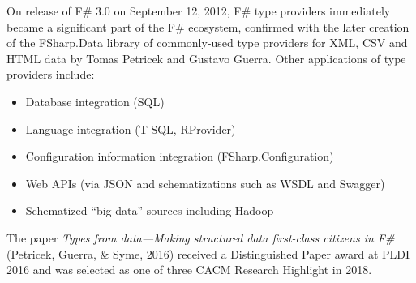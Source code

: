 \documentclass[acmsmall]{acmart}\settopmatter{}
\begin{document}
On release of F\# 3.0 on September 12, 2012,  F\# type providers immediately became a significant part of the F\# ecosystem, confirmed with the later creation of the FSharp.Data library of commonly-used type providers for XML, CSV and HTML data by Tomas Petricek and Gustavo Guerra.  Other applications of type providers include:

\begin{itemize}
\item Database integration (SQL)
\item Language integration (T-SQL, RProvider)
\item Configuration information integration (FSharp.Configuration)
\item Web APIs (via JSON and schematizations such as WSDL and Swagger)
\item Schematized “big-data” sources including Hadoop
\end{itemize}

The paper \textit{Types from data---Making structured data first-class citizens in F\#} (Petricek, Guerra, \& Syme, 2016) received a Distinguished Paper award at PLDI 2016 and was selected as one of three CACM Research Highlight in 2018.
\end{document}
